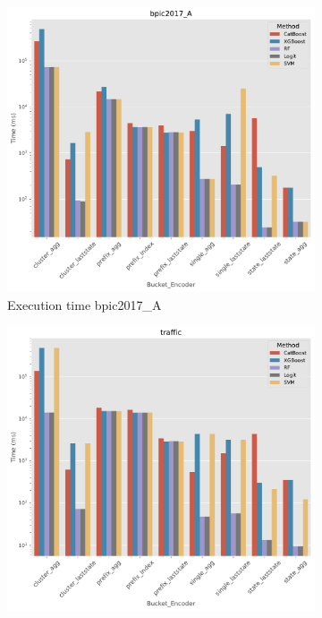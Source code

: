 \begin{figure}[!htbp] %
	
	\begin{subfigure}{0.48\textwidth}
		\includegraphics[width=\linewidth]{images/catboost/time/catboost/offline/bpic2017_A.pdf}
		
		\caption{Execution time bpic2017\_A} \label{fig:t1}
	\end{subfigure}\hspace*{\fill}
	\begin{subfigure}{0.48\textwidth}
		\includegraphics[width=\linewidth]{images/catboost/time/catboost/offline/traffic.pdf}
		

\end{subfigure}
\end{figure}

